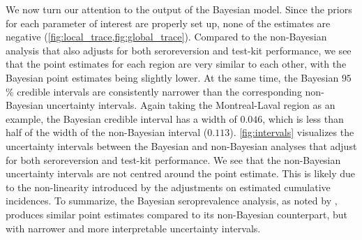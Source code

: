 We now turn our attention to the output of the Bayesian model. Since the priors for each parameter of interest are properly set up, none of the estimates are negative (\cref{fig:local_trace,fig:global_trace}). Compared to the non-Bayesian analysis that also adjusts for both seroreversion and test-kit performance, we see that the point estimates for each region are very similar to each other, with the Bayesian point estimates being slightly lower. At the same time, the Bayesian $95$\% credible intervals are consistently narrower than the corresponding non-Bayesian uncertainty intervals. Again taking the Montreal-Laval region as an example, the Bayesian credible interval has a width of $0.046$, which is less than half of the width of the non-Bayesian interval ($0.113$). \cref{fig:intervals} visualizes the uncertainty intervals between the Bayesian and non-Bayesian analyses that adjust for both seroreversion and test-kit performance. We see that the non-Bayesian uncertainty intervals are not centred around the point estimate. This is likely due to the non-linearity introduced by the adjustments on estimated cumulative incidences. To summarize, the Bayesian seroprevalence analysis, as noted by \cite{meyer2022adjusting}, produces similar point estimates compared to its non-Bayesian counterpart, but with narrower and more interpretable uncertainty intervals.

